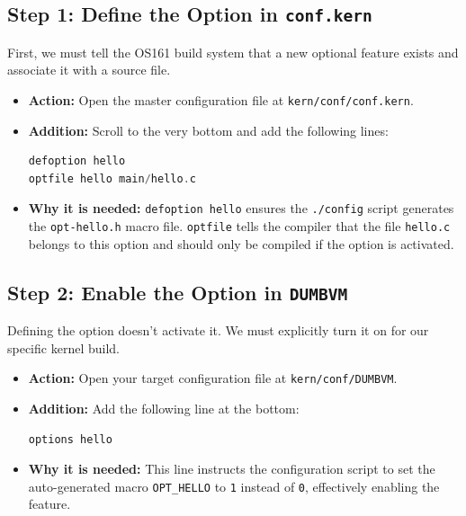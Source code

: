 \subsection{Step 1: Define the Option in \texttt{conf.kern}}
First, we must tell the OS161 build system that a new optional feature exists and associate it with a source file.
\begin{itemize}
    \item \textbf{Action:} Open the master configuration file at \texttt{kern/conf/conf.kern}.
    \item \textbf{Addition:} Scroll to the very bottom and add the following lines:
\begin{lstlisting}[language=C]
defoption hello
optfile hello main/hello.c
\end{lstlisting}
    \item \textbf{Why it is needed:} \texttt{defoption hello} ensures the \texttt{./config} script generates the \texttt{opt-hello.h} macro file. \texttt{optfile} tells the compiler that the file \texttt{hello.c} belongs to this option and should only be compiled if the option is activated.
\end{itemize}

\subsection{Step 2: Enable the Option in \texttt{DUMBVM}}
Defining the option doesn't activate it. We must explicitly turn it on for our specific kernel build.
\begin{itemize}
    \item \textbf{Action:} Open your target configuration file at \texttt{kern/conf/DUMBVM}.
    \item \textbf{Addition:} Add the following line at the bottom:
\begin{lstlisting}[language=C]
options hello
\end{lstlisting}
    \item \textbf{Why it is needed:} This line instructs the configuration script to set the auto-generated macro \texttt{OPT\_HELLO} to \texttt{1} instead of \texttt{0}, effectively enabling the feature.
\end{itemize}


